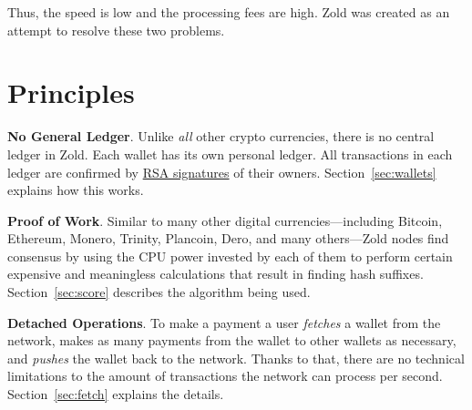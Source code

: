 \documentclass[11pt,oneside]{article}
\begin{document}
Thus, the speed is low and the processing fees are high.
Zold was created as an attempt to resolve these two problems.

\section{Principles}

\textbf{No General Ledger}.
Unlike \emph{all} other crypto currencies, there is no central ledger in Zold.
Each wallet has its own personal ledger.
All transactions in each ledger are confirmed by
\href{https://en.wikipedia.org/wiki/RSA_(cryptosystem)}{RSA signatures} of their owners.
Section~\ref{sec:wallets} explains how this works.

\textbf{Proof of Work}.
Similar to many other digital currencies---including Bitcoin, Ethereum, Monero, Trinity, Plancoin, Dero,
and many others---Zold nodes find consensus by using the CPU power invested
by each of them to perform certain expensive and meaningless calculations that result in finding hash suffixes.
Section~\ref{sec:score} describes the algorithm being used.

\textbf{Detached Operations}.
To make a payment a user \emph{fetches} a wallet from the network,
makes as many payments from the wallet to other wallets as necessary,
and \emph{pushes} the wallet back to the network.
Thanks to that, there are no technical limitations to
the amount of transactions the network can process per second.
Section~\ref{sec:fetch} explains the details.
\end{document}
